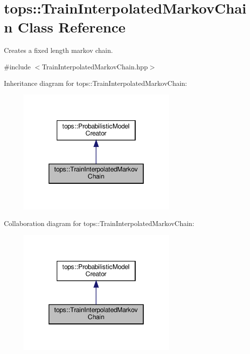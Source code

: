 \hypertarget{classtops_1_1TrainInterpolatedMarkovChain}{}\section{tops\+:\+:Train\+Interpolated\+Markov\+Chain Class Reference}
\label{classtops_1_1TrainInterpolatedMarkovChain}


Creates a fixed length markov chain.  




{\ttfamily \#include $<$Train\+Interpolated\+Markov\+Chain.\+hpp$>$}



Inheritance diagram for tops\+:\+:Train\+Interpolated\+Markov\+Chain\+:
\nopagebreak
\begin{figure}[H]
\begin{center}
\leavevmode
\includegraphics[width=226pt]{classtops_1_1TrainInterpolatedMarkovChain__inherit__graph}
\end{center}
\end{figure}


Collaboration diagram for tops\+:\+:Train\+Interpolated\+Markov\+Chain\+:
\nopagebreak
\begin{figure}[H]
\begin{center}
\leavevmode
\includegraphics[width=226pt]{classtops_1_1TrainInterpolatedMarkovChain__coll__graph}
\end{center}
\end{figure}
